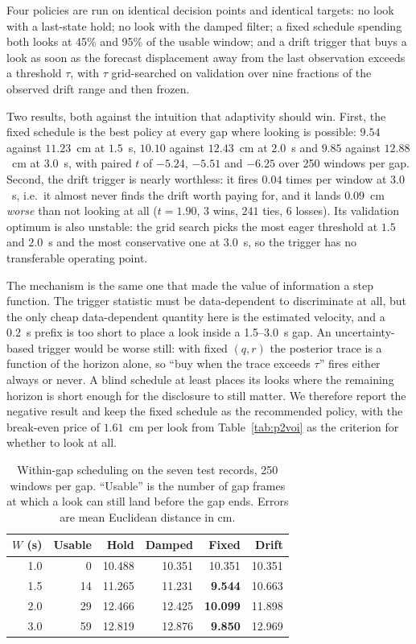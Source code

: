 \documentclass{swmcmthesis}
\begin{document}
Four policies are run on identical decision points and identical targets: no look with a last-state hold; no look with the damped filter; a fixed schedule spending both looks at 45\% and 95\% of the usable window; and a drift trigger that buys a look as soon as the forecast displacement away from the last observation exceeds a threshold $\tau$, with $\tau$ grid-searched on validation over nine fractions of the observed drift range and then frozen.

Two results, both against the intuition that adaptivity should win. First, the fixed schedule is the best policy at every gap where looking is possible: $9.54$ against $11.23$~cm at $1.5$~s, $10.10$ against $12.43$~cm at $2.0$~s and $9.85$ against $12.88$~cm at $3.0$~s, with paired $t$ of $-5.24$, $-5.51$ and $-6.25$ over 250 windows per gap. Second, the drift trigger is nearly worthless: it fires $0.04$ times per window at $3.0$~s, i.e.\ it almost never finds the drift worth paying for, and it lands $0.09$~cm \emph{worse} than not looking at all ($t=1.90$, $3$ wins, $241$ ties, $6$ losses). Its validation optimum is also unstable: the grid search picks the most eager threshold at $1.5$ and $2.0$~s and the most conservative one at $3.0$~s, so the trigger has no transferable operating point.

The mechanism is the same one that made the value of information a step function. The trigger statistic must be data-dependent to discriminate at all, but the only cheap data-dependent quantity here is the estimated velocity, and a 0.2~s prefix is too short to place a look inside a 1.5--3.0~s gap. An uncertainty-based trigger would be worse still: with fixed $(q,r)$ the posterior trace is a function of the horizon alone, so ``buy when the trace exceeds $\tau$'' fires either always or never. A blind schedule at least places its looks where the remaining horizon is short enough for the disclosure to still matter. We therefore report the negative result and keep the fixed schedule as the recommended policy, with the break-even price of $1.61$~cm per look from Table~\ref{tab:p2voi} as the criterion for whether to look at all.

\begin{table}[tbp]\centering\footnotesize
\caption{Within-gap scheduling on the seven test records, 250 windows per gap. ``Usable'' is the number of gap frames at which a look can still land before the gap ends. Errors are mean Euclidean distance in cm.}\label{tab:p2policy}
\begin{tabular}{rrrrrr}
\toprule
$W$ (s) & Usable & Hold & Damped & Fixed & Drift \\
\midrule
1.0 & 0 & 10.488 & 10.351 & 10.351 & 10.351 \\
1.5 & 14 & 11.265 & 11.231 & \textbf{9.544} & 10.663 \\
2.0 & 29 & 12.466 & 12.425 & \textbf{10.099} & 11.898 \\
3.0 & 59 & 12.819 & 12.876 & \textbf{9.850} & 12.969 \\
\bottomrule
\end{tabular}
\end{table}
\end{document}
